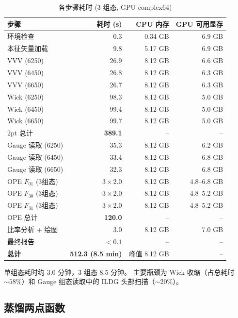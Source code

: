\documentclass[11pt,a4paper]{article}
\begin{document}
\begin{table}[H]
  \centering
  \caption{各步骤耗时 (3 组态, GPU complex64)}
  \label{tab:timing}
  \begin{tabular}{lrrr}
    \toprule
    步骤 & 耗时 (s) & CPU 内存 & GPU 可用显存 \\
    \midrule
    环境检查 & 0.3 & 0.34 GB & 6.9 GB \\
    本征矢量加载 & 9.8 & 5.17 GB & 6.9 GB \\
    VVV (6250) & 26.9 & 8.12 GB & 6.6 GB \\
    VVV (6450) & 26.8 & 8.12 GB & 6.3 GB \\
    VVV (6650) & 26.7 & 8.12 GB & 6.3 GB \\
    Wick (6250) & 98.3 & 8.12 GB & 5.0 GB \\
    Wick (6450) & 99.4 & 8.12 GB & 5.0 GB \\
    Wick (6650) & 99.7 & 8.12 GB & 5.0 GB \\
    2pt 总计 & \textbf{389.1} & -- & -- \\
    \midrule
    Gauge 读取 (6250) & 35.3 & 8.12 GB & 6.2 GB \\
    Gauge 读取 (6450) & 33.4 & 8.12 GB & 6.8 GB \\
    Gauge 读取 (6650) & 32.3 & 8.12 GB & 6.8 GB \\
    OPE $F_{01}$ (3组态) & $3\times 2.0$ & 8.12 GB & 4.8--6.8 GB \\
    OPE $F_{30}$ (3组态) & $3\times 2.0$ & 8.12 GB & 4.8--5.2 GB \\
    OPE $F_{31}$ (3组态) & $3\times 2.0$ & 8.12 GB & 4.8--5.2 GB \\
    OPE 总计 & \textbf{120.0} & -- & -- \\
    \midrule
    比率分析 + 绘图 & 3.0 & 8.12 GB & 7.0 GB \\
    最终报告 & $<0.1$ & -- & -- \\
    \midrule
    \textbf{总计} & \textbf{512.3 (8.5 min)} & 峰值 8.12 GB & -- \\
    \bottomrule
  \end{tabular}
\end{table}

单组态耗时约 3.0 分钟，3 组态 8.5 分钟。
主要瓶颈为 Wick 收缩（占总耗时 $\sim 58\%$）和
Gauge 组态读取中的 ILDG 头部扫描（$\sim 20\%$）。

\subsection{蒸馏两点函数}
\end{document}
